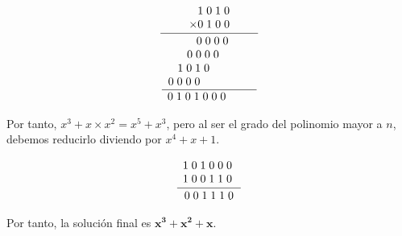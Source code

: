 \documentclass[10pt,spanish]{article}
\begin{document}
\begin{description}
    \begin{displaymath}
        \frac{
            \begin{array}[b]{r}
            1\; 0\; 1\; 0 \\
            \times 0\; 1\; 0\; 0
            \end{array}
        }{\frac{
            \begin{array}[b]{r}
                0\; 0\; 0\; 0 \;\;\;\;\;\;\;\\
                0\; 0\; 0\; 0\; \;\;\;\;\;\;\;\;\;\\
                1\; 0\; 1\; 0\; \;\;\;\;\;\;\;\;\;\;\;\;\\
                0\; 0\; 0\; 0\; \;\;\;\;\;\;\;\;\;\;\;\;\;\;\;
            \end{array}
        }{
        \begin{array}[b]{r}
        0\; 1\; 0\; 1\; 0\; 0\; 0\; \;\;\;\;\;\;\;
        \end{array}
        }}
    \end{displaymath}

    Por tanto, $x^3 + x \times x^2 = x^5 + x^3$, pero al ser el grado del polinomio mayor a $n$, debemos reducirlo diviendo por $x^4 + x + 1$.

    \begin{displaymath}
        \frac{
            \begin{array}[b]{r}
                1\; 0\; 1\; 0\; 0\; 0\;\\
                1\; 0\; 0\; 1\; 1\; 0\;
            \end{array}
        }{
            \begin{array}[b]{r}
                0\; 0\; 1\; 1\; 1\; 0
            \end{array}
        }
    \end{displaymath}

    Por tanto, la solución final es \textcolor{morado}{$\mathbf{x^3 + x^2 + x}$}.



\end{description}
\end{document}

